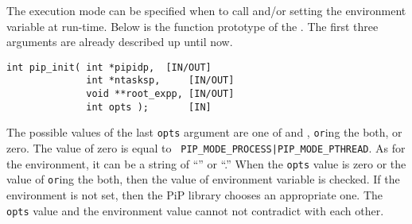 The execution mode can be specified when to call 
and/or setting the  environment variable at
run-time. Below is the function prototype of the
. The first three arguments are already described
up until now.

\begin{lstlisting}[frame=tRBl]
int pip_init( int *pipidp,	[IN/OUT]
              int *ntasksp,     [IN/OUT]
              void **root_expp, [IN/OUT]
              int opts );       [IN]
\end{lstlisting}

The possible values of the last {\tt opts} argument are one of 
 and , {\tt or}ing
the both, or zero. The value of zero is equal to {\tt
  PIP_MODE_PROCESS|PIP_MODE_PTHREAD}. As for the 
environment, it can be a string of ``'' or
``.''
When the {\tt opts} value is zero or the value of {\tt or}ing the
both, then the value of  environment variable is
checked. If the environment is not set, then the PiP library chooses
an appropriate one. The {\tt opts} value and the environment value
cannot not contradict with each other.

